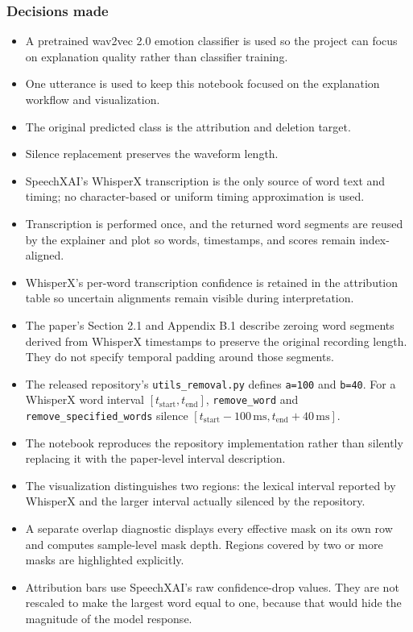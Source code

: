 \documentclass[11pt]{article}
\begin{document}
\subsubsection*{Decisions made}
\begin{itemize}
  \item A pretrained wav2vec 2.0 emotion classifier is used so the project can focus on explanation quality rather than classifier training.
  \item One utterance is used to keep this notebook focused on the explanation workflow and visualization.
  \item The original predicted class is the attribution and deletion target.
  \item Silence replacement preserves the waveform length.
  \item SpeechXAI's WhisperX transcription is the only source of word text and timing; no character-based or uniform timing approximation is used.
  \item Transcription is performed once, and the returned word segments are reused by the explainer and plot so words, timestamps, and scores remain index-aligned.
  \item WhisperX's per-word transcription confidence is retained in the attribution table so uncertain alignments remain visible during interpretation.
  \item The paper's Section 2.1 and Appendix B.1 describe zeroing word segments derived from WhisperX timestamps to preserve the original recording length. They do not specify temporal padding around those segments.
  \item The released repository's \texttt{utils\_removal.py} defines \texttt{a=100} and \texttt{b=40}. For a WhisperX word interval $[t_{\mathrm{start}},t_{\mathrm{end}}]$, \texttt{remove\_word} and \texttt{remove\_specified\_words} silence $[t_{\mathrm{start}}-100\,\mathrm{ms},t_{\mathrm{end}}+40\,\mathrm{ms}]$.
  \item The notebook reproduces the repository implementation rather than silently replacing it with the paper-level interval description.
  \item The visualization distinguishes two regions: the lexical interval reported by WhisperX and the larger interval actually silenced by the repository.
  \item A separate overlap diagnostic displays every effective mask on its own row and computes sample-level mask depth. Regions covered by two or more masks are highlighted explicitly.
  \item Attribution bars use SpeechXAI's raw confidence-drop values. They are not rescaled to make the largest word equal to one, because that would hide the magnitude of the model response.

\end{itemize}
\end{document}

